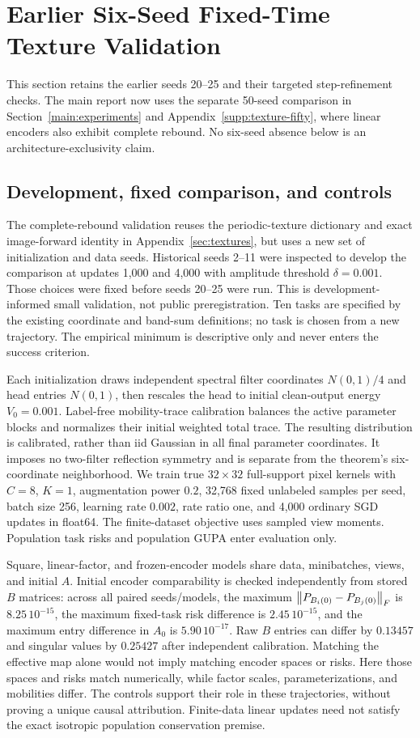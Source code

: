 \section{Earlier Six-Seed Fixed-Time Texture Validation}
\label{supp:encoder-rebound}
This section retains the earlier seeds 20--25 and their targeted step-refinement checks. The main report now uses the separate 50-seed comparison in Section~\ref{main:experiments} and Appendix~\ref{supp:texture-fifty}, where linear encoders also exhibit complete rebound. No six-seed absence below is an architecture-exclusivity claim.
\subsection{Development, fixed comparison, and controls}
The complete-rebound validation reuses the periodic-texture dictionary and exact image-forward identity in Appendix~\ref{sec:textures}, but uses a new set of initialization and data seeds. Historical seeds 2--11 were inspected to develop the comparison at updates 1,000 and 4,000 with amplitude threshold $\delta=0.001$. Those choices were fixed before seeds 20--25 were run. This is development-informed small validation, not public preregistration. Ten tasks are specified by the existing coordinate and band-sum definitions; no task is chosen from a new trajectory. The empirical minimum is descriptive only and never enters the success criterion.

Each initialization draws independent spectral filter coordinates $N(0,1)/4$ and head entries $N(0,1)$, then rescales the head to initial clean-output energy $V_0=0.001$. Label-free mobility-trace calibration balances the active parameter blocks and normalizes their initial weighted total trace. The resulting distribution is calibrated, rather than iid Gaussian in all final parameter coordinates. It imposes no two-filter reflection symmetry and is separate from the theorem's six-coordinate neighborhood. We train true $32\times32$ full-support pixel kernels with $C=8$, $K=1$, augmentation power $0.2$, 32,768 fixed unlabeled samples per seed, batch size 256, learning rate $0.002$, rate ratio one, and 4,000 ordinary SGD updates in float64. The finite-dataset objective uses sampled view moments. Population task risks and population GUPA enter evaluation only.

Square, linear-factor, and frozen-encoder models share data, minibatches, views, and initial $A$. Initial encoder comparability is checked independently from stored $B$ matrices: across all paired seeds/models, the maximum $\left\lVert P_{B_i(0)}-P_{B_j(0)}\right\rVert_F$ is $8.25\,10^{-15}$, the maximum fixed-task risk difference is $2.45\,10^{-15}$, and the maximum entry difference in $A_0$ is $5.90\,10^{-17}$. Raw $B$ entries can differ by $0.13457$ and singular values by $0.25427$ after independent calibration. Matching the effective map alone would not imply matching encoder spaces or risks. Here those spaces and risks match numerically, while factor scales, parameterizations, and mobilities differ. The controls support their role in these trajectories, without proving a unique causal attribution. Finite-data linear updates need not satisfy the exact isotropic population conservation premise.

